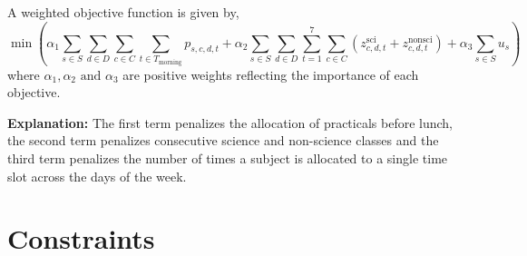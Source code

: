 \documentclass[11pt]{article}
\begin{document}
\noindent A weighted objective function is given by,
\[
\min \left( 
\alpha_1 \sum_{s \in S}\sum_{d \in D}\sum_{c \in C}\sum_{t \in T_\text{morning}} p_{s,c,d,t} + \alpha_2 \sum_{s \in S}\sum_{d \in D}\sum_{t=1}^{7}\sum_{c \in C} \left(z_{c,d,t}^{\text{sci}} + z_{c,d,t}^{\text{nonsci}}\right)
+ \alpha_3 \sum_{s \in S} u_s
\right)
\]
\indent where \(\alpha_1,\alpha_2 \text{ and } \alpha_3\) are positive weights reflecting the importance of each objective.

\noindent\textbf{Explanation:} The first term penalizes the allocation of practicals before lunch, the second term penalizes consecutive science and non-science classes and the third term penalizes the number of times a subject is allocated to a single time slot across the days of the week.

\section*{Constraints}
\end{document}
